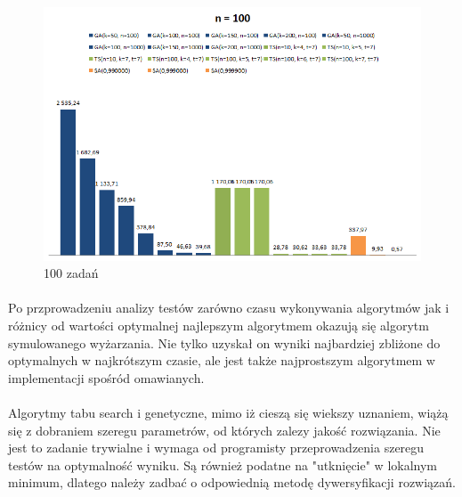 \documentclass[wide,a4paper,titlepage,12pt] {article}
\begin{document}
\begin{landscape}
\begin{figure}[htbp]
  \begin{center}
         \includegraphics[scale = 1.0]{img/all100.PNG}
         \caption{100 zadań}
  \end{center}
\end{figure}
\end{landscape}


\paragraph{}
Po przprowadzeniu analizy testów zarówno czasu wykonywania algorytmów jak i różnicy od wartości optymalnej najlepszym algorytmem okazują się algorytm symulowanego wyżarzania. Nie tylko uzyskał on wyniki najbardziej zbliżone do optymalnych w najkrótszym czasie, ale jest także najprostszym algorytmem w implementacji spośród omawianych.

\paragraph{}
Algorytmy tabu search i genetyczne, mimo iż cieszą się wiekszy uznaniem, wiążą się z dobraniem szeregu parametrów, od których zalezy jakość rozwiązania. Nie jest to zadanie trywialne i wymaga od programisty przeprowadzenia szeregu testów na optymalność wyniku. Są również podatne na "utknięcie" w lokalnym minimum, dlatego należy zadbać o odpowiednią metodę dywersyfikacji rozwiązań.
\end{document}
